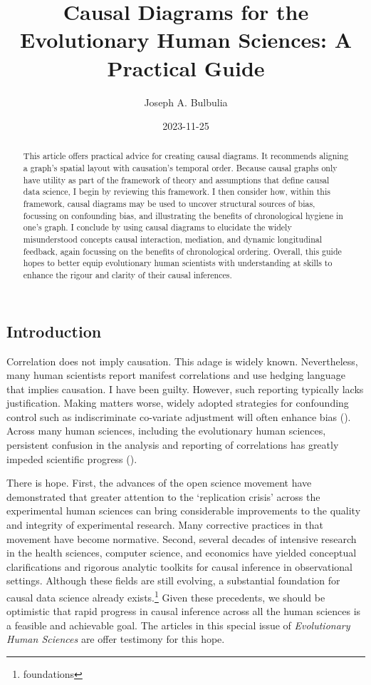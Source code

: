 \documentclass[
  singlecolumn,
  9pt]{article}
\title{Causal Diagrams for the Evolutionary Human Sciences: A Practical
Guide}
\author{Joseph A. Bulbulia}
\affil{%
                  Victoria University of Wellington, New Zealand, School
                  of Psychology, Centre for Applied Cross-Cultural
                  Research
              }
\date{2023-11-25}
\begin{document}
\maketitle
\begin{abstract}
This article offers practical advice for creating causal diagrams. It
recommends aligning a graph's spatial layout with causation's temporal
order. Because causal graphs only have utility as part of the framework
of theory and assumptions that define causal data science, I begin by
reviewing this framework. I then consider how, within this framework,
causal diagrams may be used to uncover structural sources of bias,
focussing on confounding bias, and illustrating the benefits of
chronological hygiene in one's graph. I conclude by using causal
diagrams to elucidate the widely misunderstood concepts causal
interaction, mediation, and dynamic longitudinal feedback, again
focussing on the benefits of chronological ordering. Overall, this guide
hopes to better equip evolutionary human scientists with understanding
at skills to enhance the rigour and clarity of their causal inferences.
\end{abstract}
\subsection{Introduction}\label{introduction}

Correlation does not imply causation. This adage is widely known.
Nevertheless, many human scientists report manifest correlations and use
hedging language that implies causation. I have been guilty. However,
such reporting typically lacks justification. Making matters worse,
widely adopted strategies for confounding control such as indiscriminate
co-variate adjustment will often enhance bias
(). Across many human
sciences, including the evolutionary human sciences, persistent
confusion in the analysis and reporting of correlations has greatly
impeded scientific progress ().

There is hope. First, the advances of the open science movement have
demonstrated that greater attention to the `replication crisis' across
the experimental human sciences can bring considerable improvements to
the quality and integrity of experimental research. Many corrective
practices in that movement have become normative. Second, several
decades of intensive research in the health sciences, computer science,
and economics have yielded conceptual clarifications and rigorous
analytic toolkits for causal inference in observational settings.
Although these fields are still evolving, a substantial foundation for
causal data science already exists.\footnote{foundations} Given these
precedents, we should be optimistic that rapid progress in causal
inference across all the human sciences is a feasible and achievable
goal. The articles in this special issue of \emph{Evolutionary Human
Sciences} are offer testimony for this hope.
\end{document}
